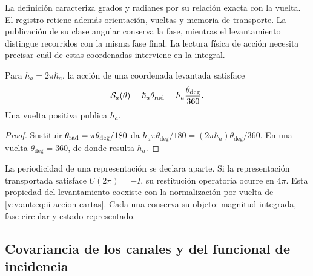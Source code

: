 La definición caracteriza grados y radianes por su relación exacta
con la vuelta. El registro retiene además orientación, vueltas y
memoria de transporte. La publicación de su clase angular conserva
la fase, mientras el levantamiento distingue recorridos con la misma
fase final. La lectura física de acción necesita precisar cuál de
estas coordenadas interviene en la integral.

\begin{proposition}
Para \(h_a=2\pi\hbar_a\), la acción de una coordenada levantada
satisface
\begin{equation}
 \mathcal S_a(\theta)
 =\hbar_a\theta_{\rm rad}
 =h_a\frac{\theta_{\deg}}{360}.
 \label{v:v:ant:eq:ii-accion-cartas}
\end{equation}
Una vuelta positiva publica \(h_a\).
\end{proposition}
\begin{proof}
Sustituir \(\theta_{\rm rad}=\pi\theta_{\deg}/180\) da
\(\hbar_a\pi\theta_{\deg}/180
=(2\pi\hbar_a)\theta_{\deg}/360\). En una vuelta
\(\theta_{\deg}=360\), de donde resulta \(h_a\).
\end{proof}

La periodicidad de una representación se declara aparte. Si la
representación transportada satisface \(U(2\pi)=-I\), su restitución
operatoria ocurre en \(4\pi\). Esta propiedad del levantamiento
coexiste con la normalización por vuelta de
\eqref{v:v:ant:eq:ii-accion-cartas}. Cada una conserva su objeto: magnitud
integrada, fase circular y estado representado.

\subsection{Covariancia de los canales y del funcional de incidencia}

